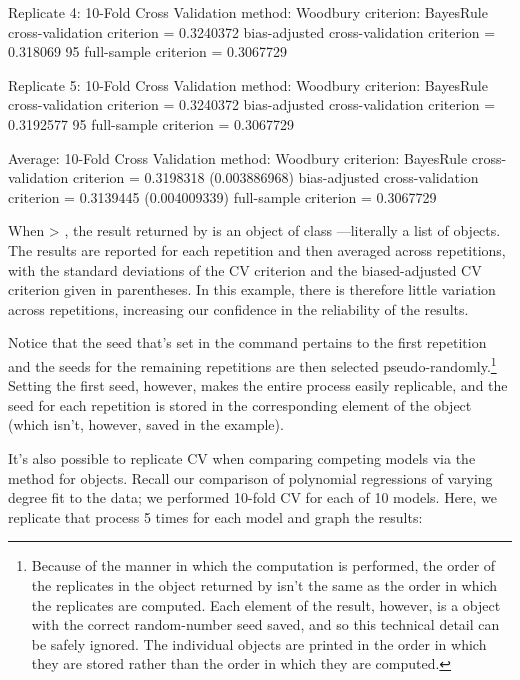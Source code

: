 \documentclass[
]{jss}
\begin{document}
\begin{CodeChunk}
\begin{CodeOutput}
Replicate 4:
10-Fold Cross Validation
method: Woodbury
criterion: BayesRule
cross-validation criterion = 0.3240372
bias-adjusted cross-validation criterion = 0.318069
95%
full-sample criterion = 0.3067729 

Replicate 5:
10-Fold Cross Validation
method: Woodbury
criterion: BayesRule
cross-validation criterion = 0.3240372
bias-adjusted cross-validation criterion = 0.3192577
95%
full-sample criterion = 0.3067729 

Average:
10-Fold Cross Validation
method: Woodbury
criterion: BayesRule
cross-validation criterion = 0.3198318 (0.003886968)
bias-adjusted cross-validation criterion = 0.3139445 (0.004009339)
full-sample criterion = 0.3067729 
\end{CodeOutput}
\end{CodeChunk}

When  \textgreater{} , the result returned by
 is an object of class ---literally a list of
 objects. The results are reported for each repetition and
then averaged across repetitions, with the standard deviations of the CV
criterion and the biased-adjusted CV criterion given in parentheses. In
this example, there is therefore little variation across repetitions,
increasing our confidence in the reliability of the results.

Notice that the seed that's set in the  command pertains to
the first repetition and the seeds for the remaining repetitions are
then selected pseudo-randomly.\footnote{Because of the manner in which
  the computation is performed, the order of the replicates in the
   object returned by  isn't the same as the
  order in which the replicates are computed. Each element of the
  result, however, is a  object with the correct
  random-number seed saved, and so this technical detail can be safely
  ignored. The individual  objects are printed in the order
  in which they are stored rather than the order in which they are
  computed.} Setting the first seed, however, makes the entire process
easily replicable, and the seed for each repetition is stored in the
corresponding element of the  object (which isn't,
however, saved in the example).

It's also possible to replicate CV when comparing competing models via
the  method for  objects. Recall our
comparison of polynomial regressions of varying degree fit to the
 data; we performed 10-fold CV for each of 10 models. Here,
we replicate that process 5 times for each model and graph the results:
\end{document}
